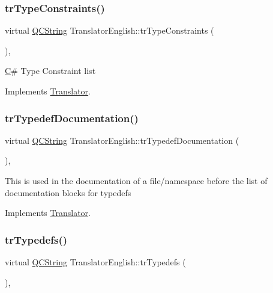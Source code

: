 \subsubsection{\texorpdfstring{trTypeConstraints()}{trTypeConstraints()}}
{\footnotesize\ttfamily virtual \mbox{\hyperlink{class_q_c_string}{Q\+C\+String}} Translator\+English\+::tr\+Type\+Constraints (\begin{DoxyParamCaption}{ }\end{DoxyParamCaption})\hspace{0.3cm}{\ttfamily [inline]}, {\ttfamily [virtual]}}

\mbox{\hyperlink{class_c}{C}}\# Type Constraint list 

Implements \mbox{\hyperlink{class_translator}{Translator}}.

\mbox{\label{class_translator_english_a07666a93bb0724e64e375b39ce3a0a0f}} 
\subsubsection{\texorpdfstring{trTypedefDocumentation()}{trTypedefDocumentation()}}
{\footnotesize\ttfamily virtual \mbox{\hyperlink{class_q_c_string}{Q\+C\+String}} Translator\+English\+::tr\+Typedef\+Documentation (\begin{DoxyParamCaption}{ }\end{DoxyParamCaption})\hspace{0.3cm}{\ttfamily [inline]}, {\ttfamily [virtual]}}

This is used in the documentation of a file/namespace before the list of documentation blocks for typedefs 

Implements \mbox{\hyperlink{class_translator}{Translator}}.

\mbox{\label{class_translator_english_af8f2ea5a6e5d55f4ecf6bd1e146e65dd}} 
\subsubsection{\texorpdfstring{trTypedefs()}{trTypedefs()}}
{\footnotesize\ttfamily virtual \mbox{\hyperlink{class_q_c_string}{Q\+C\+String}} Translator\+English\+::tr\+Typedefs (\begin{DoxyParamCaption}{ }\end{DoxyParamCaption})\hspace{0.3cm}{\ttfamily [inline]}, {\ttfamily [virtual]}}

